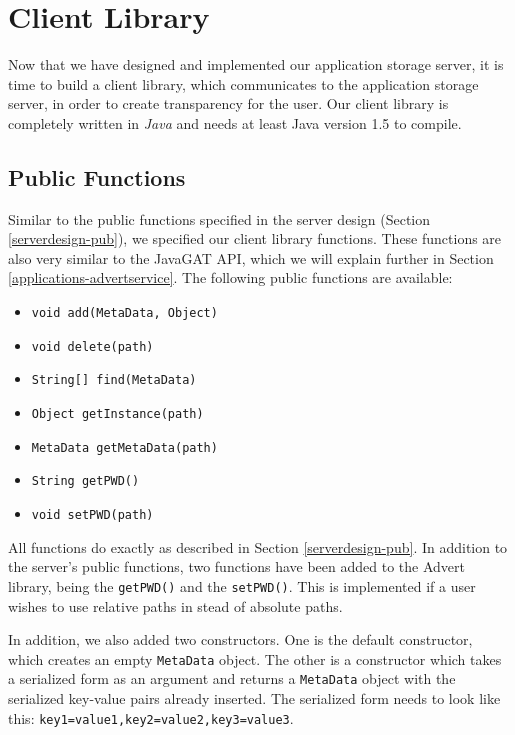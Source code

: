 \section{Client Library}
\label{clientimpl}
Now that we have designed and implemented our application storage server, it is
time to build a client library, which communicates to the application storage
server, in order to create transparency for the user. Our client library is
completely written in \emph{Java} \cite{java-www} and needs at least Java
version 1.5 to compile.

\subsection{Public Functions}
Similar to the public functions specified in the server design (Section
\ref{serverdesign-pub}), we specified our client library functions. These
functions are also very similar to the JavaGAT API, which we will explain
further in Section \ref{applications-advertservice}. The following public
functions are available:

\begin{itemize}
	\item \texttt{void add(MetaData, Object)} 
	\item \texttt{void delete(path)}
	\item \texttt{String[] find(MetaData)}
	\item \texttt{Object getInstance(path)}
	\item \texttt{MetaData getMetaData(path)}
	\item \texttt{String getPWD()}
	\item \texttt{void setPWD(path)} 
\end{itemize}

All functions do exactly as described in Section \ref{serverdesign-pub}. In
addition to the server's public functions, two functions have been added to the
Advert library, being the \texttt{getPWD()} and the \texttt{setPWD()}. This is
implemented if a user wishes to use relative paths in stead of absolute paths.

In addition, we also added two constructors. One is the default constructor,
which creates an empty \texttt{MetaData} object. The other is a constructor
which takes a serialized form as an argument and returns a \texttt{MetaData}
object with the serialized key-value pairs already inserted. The serialized
form needs to look like this: \texttt{key1=value1,key2=value2,key3=value3}.

